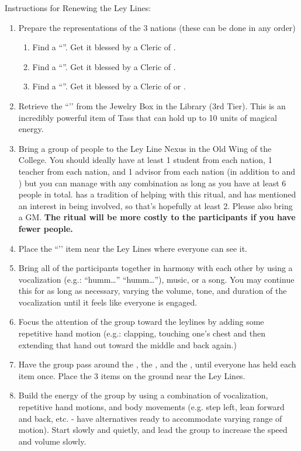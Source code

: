 \documentclass[green]{GL2020}
\begin{document}
Instructions for Renewing the Ley Lines:
\begin{enumerate}
  \item Prepare the representations of the 3 nations (these can be done in any order)
  \begin{enumerate}
    \item Find a ``\iClay{}''. Get it blessed by a Cleric of \cFarmGod{}.
    \item Find a ``\iObsidian{}''. Get it blessed by a Cleric of \cTechGod{}.
    \item Find a ``\iLimestone{}''. Get it blessed by a Cleric of \cEbb{} or \cFlow{}.
  \end{enumerate}  
 \item Retrieve the ``\iDiamond{}’’ from the Jewelry Box in the Library (3rd Tier). This is an incredibly powerful item of Tass that can hold up to 10 units of magical energy.
  \item Bring a group of people to the Ley Line Nexus in the Old Wing of the College. You should ideally have at least 1 student from each nation, 1 teacher from each nation, and 1 advisor from each nation (in addition to \cBeetle{} and \cPrincipal{}) but you can manage with any combination as long as you have at least 6 people in total. \cBunker{\full} has a tradition of helping with this ritual, and \cPresident{\full} has mentioned an interest in being involved, so that’s hopefully at least 2. Please also bring a GM. \textbf{The ritual will be more costly to the participants if you have fewer people.}
  \item Place the ``\iDiamond{}’’ item near the Ley Lines where everyone can see it.
  \item Bring all of the participants together in harmony with each other by using a vocalization (e.g.: “humm…” “humm…”), music, or a song. You may continue this for as long as necessary, varying the volume, tone, and duration of the vocalization until it feels like everyone is engaged.
  \item Focus the attention of the group toward the leylines by adding some repetitive hand motion (e.g.: clapping, touching one’s chest and then extending that hand out toward the middle and back again.)
  \item Have the group pass around the \iClay{}, the \iObsidian{}, and the \iLimestone{}, until everyone has held each item once. Place the 3 items on the ground near the Ley Lines.
  \item Build the energy of the group by using a combination of vocalization, repetitive hand motions, and body movements (e.g. step left, lean forward and back, etc. - have alternatives ready to accommodate varying range of motion). Start slowly and quietly, and lead the group to increase the speed and volume slowly.

\end{enumerate}
\end{document}

